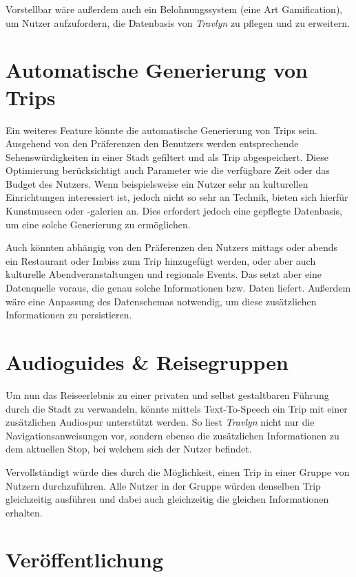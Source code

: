 		Vorstellbar wäre außerdem auch ein Belohnungssystem (eine Art Gamification), um Nutzer aufzufordern, die Datenbasis von \textit{Travlyn} zu pflegen und zu erweitern. 
				
	\section{Automatische Generierung von Trips}
	
		Ein weiteres Feature könnte die automatische Generierung von Trips sein. Ausgehend von den Präferenzen den Benutzers werden entsprechende Sehenswürdigkeiten in einer Stadt gefiltert und als Trip abgespeichert. Diese Optimierung berücksichtigt auch Parameter wie die verfügbare Zeit oder das Budget des Nutzers. Wenn beispielsweise ein Nutzer sehr an kulturellen Einrichtungen interessiert ist, jedoch nicht so sehr an Technik, bieten sich hierfür \zB Kunstmuseen oder -galerien an. Dies erfordert jedoch eine gepflegte Datenbasis, um eine solche Generierung zu ermöglichen. 
		
		Auch könnten abhängig von den Präferenzen den Nutzers mittags oder abends ein Restaurant oder Imbiss zum Trip hinzugefügt werden, oder aber auch kulturelle Abendveranstaltungen und regionale Events. Das setzt aber eine Datenquelle voraus, die genau solche Informationen bzw. Daten liefert. Außerdem wäre eine Anpassung des Datenschemas notwendig, um diese zusätzlichen Informationen zu persistieren. 
		
	\section{Audioguides \& Reisegruppen}
	
		Um nun das Reiseerlebnis zu einer privaten und selbst gestaltbaren Führung durch die Stadt zu verwandeln, könnte mittels Text-To-Speech ein Trip mit einer zusätzlichen Audiospur unterstützt werden. So liest \textit{Travlyn} nicht nur die Navigationsanweisungen vor, sondern ebenso die zusätzlichen Informationen zu dem aktuellen Stop, bei welchem sich der Nutzer befindet. 
		
		Vervollständigt würde dies durch die Möglichkeit, einen Trip in einer Gruppe von Nutzern durchzuführen. Alle Nutzer in der Gruppe würden denselben Trip gleichzeitig ausführen und dabei auch gleichzeitig die gleichen Informationen erhalten. 
		
	\section{Veröffentlichung}
	
